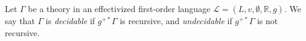 Let $\Gamma$ be a theory in an effectivized first-order language $\mathcal{L} = (L, v, \emptyset, \mathbb{R}, g)$. We say that $\Gamma$ is \emph{decidable} if $g^{+*} \Gamma$ is recursive, and \emph{undecidable} if $g^{+*} \Gamma$ is not recursive.
